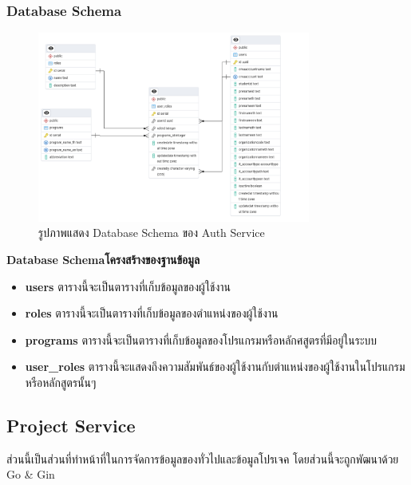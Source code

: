 \subsubsection{Database Schema}
\begin{figure}[H]
  \centering
  \includegraphics[width=0.8\textwidth]{pictures/auth_db.png}
  \caption{รูปภาพแสดง Database Schema ของ Auth Service}
  \label{fig:auth_service}
\end{figure}
\textbf{\ifenglish Database Schema\else โครงสร้างของฐานข้อมูล\fi}
\begin{itemize}
  \item \textbf{users} ตารางนี้จะเป็นตารางที่เก็บข้อมูลของผู้ใช้งาน 
  \item \textbf{roles} ตารางนี้จะเป็นตารางที่เก็บข้อมูลของตำแหน่งของผู้ใช้งาน
  \item \textbf{programs} ตารางนี้จะเป็นตารางที่เก็บข้อมูลของโปรแกรมหรือหลักศสูตรที่มีอยู่ในระบบ
  \item \textbf{user\_roles} ตารางนี้จะแสดงถึงความสัมพันธ์ของผู้ใช้งานกับตำแหน่งของผู้ใช้งานในโปรแกรมหรือหลักสูตรนั้นๆ
\end{itemize}
\subsection{Project Service}
\hspace{1.27cm} \raggedright ส่วนนี้เป็นส่วนที่ทำหน้าที่ในการจัดการข้อมูลของทั่วไปและข้อมูลโปรเจค โดยส่วนนี้จะถูกพัฒนาด้วย Go \& Gin 
